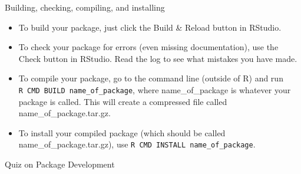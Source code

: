\documentclass[10pt,ignorenonframetext,]{beamer}
\providecommand{\tightlist}{%
\setlength{\itemsep}{0pt}\setlength{\parskip}{0pt}}
\begin{document}
\begin{frame}[fragile]{Building, checking, compiling, and installing}

\begin{itemize}
\tightlist
\item
  To build your package, just click the Build \& Reload button in
  RStudio.
\item
  To check your package for errors (even missing documentation), use the
  Check button in RStudio. Read the log to see what mistakes you have
  made.
\item
  To compile your package, go to the command line (outside of R) and run
  \texttt{R\ CMD\ BUILD\ name\_of\_package}, where name\_of\_package is
  whatever your package is called. This will create a compressed file
  called name\_of\_package.tar.gz.
\item
  To install your compiled package (which should be called
  name\_of\_package.tar.gz), use
  \texttt{R\ CMD\ INSTALL\ name\_of\_package}.
\end{itemize}

\end{frame}

\begin{frame}{Quiz on Package Development}

\end{frame}
\end{document}
